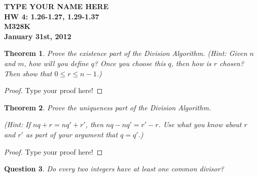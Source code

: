 \documentclass[12pt,leqno]{article}
\numberwithin{equation}{section}
\newtheorem{thm}{Theorem}[section]
\newtheorem{ques}[thm]{Question}
\theoremstyle{definition}
\begin{document}
\thispagestyle{plain}
\begin{flushright}
\large{\textbf{TYPE YOUR NAME HERE \\
HW 4: 1.26-1.27, 1.29-1.37\\
M328K \\
January 31st, 2012 \\}}
\end{flushright}

\markboth{}{} \setcounter{section}{0} \baselineskip=18pt

\setcounter{tocdepth}{4}



\setcounter{section}{1}

\setcounter{thm}{25}

\begin{thm}
Prove the existence part of the Division Algorithm. (\textit{Hint}:
Given $n$ and $m$, how will you define $q$?  Once you choose this
$q$, then how is $r$ chosen?  Then show that $0 \leq r \leq n-1$.)
\end{thm}

\begin{proof}[Proof]
Type your proof here!
\end{proof}

\begin{thm}
Prove the uniqueness part of the Division Algorithm.

(\textit{Hint}: If $nq + r = nq' + r'$, then $nq -nq' = r' - r$. Use
what you know about $r$ and $r'$ as part of your argument that $q =
q'$.)
\end{thm}

\begin{proof}[Proof]
Type your proof here!
\end{proof}

\setcounter{thm}{28}

\begin{ques}
Do every two integers have at least one common divisor?
\end{ques}
\end{document}
